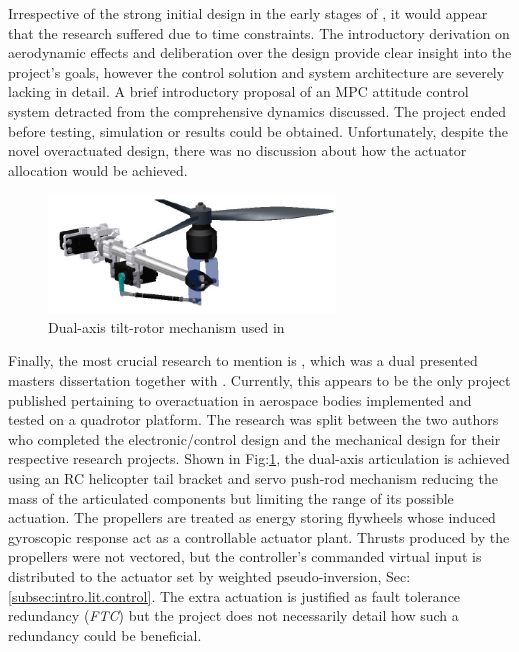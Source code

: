 \par
Irrespective of the strong initial design in the early stages of \cite{napsholm}, it would appear that the research suffered due to time constraints. The introductory derivation on aerodynamic effects and deliberation over the design provide clear insight into the project's goals, however the control solution and system architecture are severely lacking in detail. A brief introductory proposal of an MPC attitude control system detracted from the comprehensive dynamics discussed. The project ended before testing, simulation or results could be obtained. Unfortunately, despite the novel overactuated design, there was no discussion about how the actuator allocation would be achieved.
\par
\begin{figure}[htbp]
\vspace{-10pt}
\centering
\includegraphics[width=0.68\textwidth]{figs/gasco-mech}
\vspace{-14pt}
\caption{Dual-axis tilt-rotor mechanism used in \cite{tiltgasco}}
\label{fig:tiltrotor-gasco}
\vspace{-10pt}
\end{figure}
Finally, the most crucial research to mention is \cite{tiltgasco}, which was a dual presented masters dissertation together with \cite{tiltrihani}. Currently, this appears to be the only project published pertaining to overactuation in aerospace bodies implemented and tested on a quadrotor platform. The research was split between the two authors who completed the electronic/control design and the mechanical design for their respective research projects. Shown in Fig:\ref{fig:tiltrotor-gasco}, the dual-axis articulation is achieved using an RC helicopter tail bracket and servo push-rod mechanism reducing the mass of the articulated components but limiting the range of its possible actuation. The propellers are treated as energy storing flywheels whose induced gyroscopic response act as a controllable actuator plant. Thrusts produced by the propellers were not vectored, but the controller's commanded virtual input is distributed to the actuator set by weighted pseudo-inversion, Sec:\ref{subsec:intro.lit.control}. The extra actuation is justified as fault tolerance redundancy (\emph{FTC}) but the project does not necessarily detail how such a redundancy could be beneficial.
